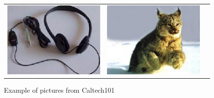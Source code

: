 \begin{figure}[h]
{\begin{tabular}{c c c}
\includegraphics[scale=0.2]{./pictures/caltech_5.jpg} &
\includegraphics[scale=0.2]{./pictures/caltech_6.jpg}
\end{tabular}
}
\caption{Example of pictures from Caltech101}
\end{figure}